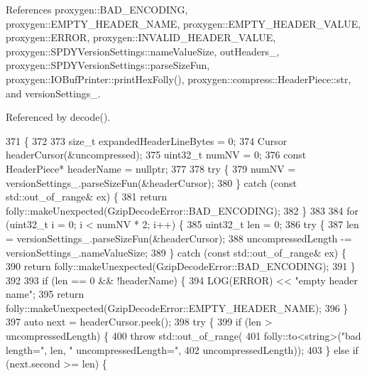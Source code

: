 References proxygen\+::\+B\+A\+D\+\_\+\+E\+N\+C\+O\+D\+I\+NG, proxygen\+::\+E\+M\+P\+T\+Y\+\_\+\+H\+E\+A\+D\+E\+R\+\_\+\+N\+A\+ME, proxygen\+::\+E\+M\+P\+T\+Y\+\_\+\+H\+E\+A\+D\+E\+R\+\_\+\+V\+A\+L\+UE, proxygen\+::\+E\+R\+R\+OR, proxygen\+::\+I\+N\+V\+A\+L\+I\+D\+\_\+\+H\+E\+A\+D\+E\+R\+\_\+\+V\+A\+L\+UE, proxygen\+::\+S\+P\+D\+Y\+Version\+Settings\+::name\+Value\+Size, out\+Headers\+\_\+, proxygen\+::\+S\+P\+D\+Y\+Version\+Settings\+::parse\+Size\+Fun, proxygen\+::\+I\+O\+Buf\+Printer\+::print\+Hex\+Folly(), proxygen\+::compress\+::\+Header\+Piece\+::str, and version\+Settings\+\_\+.



Referenced by decode().


\begin{DoxyCode}
371                                                                        \{
372 
373   \textcolor{keywordtype}{size\_t} expandedHeaderLineBytes = 0;
374   Cursor headerCursor(&uncompressed);
375   uint32\_t numNV = 0;
376   \textcolor{keyword}{const} HeaderPiece* headerName = \textcolor{keyword}{nullptr};
377 
378   \textcolor{keywordflow}{try} \{
379     numNV = versionSettings_.parseSizeFun(&headerCursor);
380   \} \textcolor{keywordflow}{catch} (\textcolor{keyword}{const} std::out\_of\_range& ex) \{
381     \textcolor{keywordflow}{return} folly::makeUnexpected(GzipDecodeError::BAD_ENCODING);
382   \}
383 
384   \textcolor{keywordflow}{for} (uint32\_t i = 0; i < numNV * 2; i++) \{
385     uint32\_t len = 0;
386     \textcolor{keywordflow}{try} \{
387       len = versionSettings_.parseSizeFun(&headerCursor);
388       uncompressedLength -= versionSettings_.nameValueSize;
389     \} \textcolor{keywordflow}{catch} (\textcolor{keyword}{const} std::out\_of\_range& ex) \{
390       \textcolor{keywordflow}{return} folly::makeUnexpected(GzipDecodeError::BAD_ENCODING);
391     \}
392 
393     \textcolor{keywordflow}{if} (len == 0 && !headerName) \{
394       LOG(ERROR) << \textcolor{stringliteral}{"empty header name"};
395       \textcolor{keywordflow}{return} folly::makeUnexpected(GzipDecodeError::EMPTY_HEADER_NAME);
396     \}
397     \textcolor{keyword}{auto} next = headerCursor.peek();
398     \textcolor{keywordflow}{try} \{
399       \textcolor{keywordflow}{if} (len > uncompressedLength) \{
400         \textcolor{keywordflow}{throw} std::out\_of\_range(
401           folly::to<string>(\textcolor{stringliteral}{"bad length="}, len, \textcolor{stringliteral}{" uncompressedLength="},
402                             uncompressedLength));
403       \} \textcolor{keywordflow}{else} \textcolor{keywordflow}{if} (next.second >= len) \{

\end{DoxyCode}
